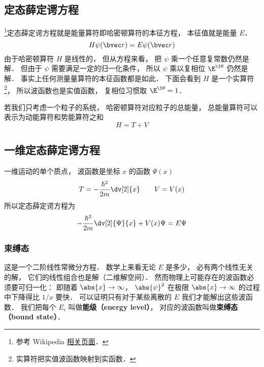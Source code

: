 
\begin{issues}
\issueTODO
\issueAbstract
\end{issues}


\subsection{定态薛定谔方程}
\footnote{参考 Wikipedia \href{https://en.wikipedia.org/wiki/Finite_potential_well}{相关页面}．}定态薛定谔方程就是能量算符即哈密顿算符的本征方程， 本征值就是能量 $E$．
\begin{equation}
H \psi(\bvec r) = E \psi(\bvec r)
\end{equation}
由于哈密顿算符 $H$ 是线性的， 但从方程来看， 把 $\psi$ 乘一个任意复常数仍然是解． 但由于 $\psi$ 需要满足一定的归一化条件， 所以 $\psi$ 乘以复相位 $\E^{\I\theta}$ 仍然是解． 事实上任何测量量算符的本征函数都是如此． 下面会看到 $H$ 是一个实算符\footnote{实算符把实值波函数映射到实函数．}， 所以波函数也是实值函数， 复相位习惯取 $\E^{\I\theta} = 1$．

若我们只考虑一个粒子的系统， 哈密顿算符对应粒子的总能量， 总能量算符可以表示为动能算符和势能算符之和
\begin{equation}
H = T + V
\end{equation}

\subsection{一维定态薛定谔方程}

一维运动的单个质点， 波函数是坐标 $x$ 的函数 $\Psi(x)$
\begin{equation}
T = -\frac{\hbar^2}{2m} \dv[2]{x} \qquad V = V(x)
\end{equation}
所以定态薛定谔方程为
\begin{equation}\label{SchEq_eq1}
-\frac{\hbar^2}{2m} \dv[2]{\Psi}{x} + V(x)\Psi = E \Psi
\end{equation}

\subsubsection{束缚态}
这是一个二阶线性常微分方程． 数学上来看无论 $E$ 是多少， 必有两个线性无关的解， 它们的线性组合也是解（二维解空间）． 然而物理上可能存在的波函数必须要可归一化： 即随着 $\abs{x} \to \infty$，  $\abs{\psi}^2$ 在极限 $\abs{x}\to\infty$ 的过程中下降得比 $1/x$ 要快． 可以证明只有对于某些离散的 $E$ 我们才能解出这些波函数． 我们把每个 $E_i$ 叫做\textbf{能级（energy level）}， 对应的波函数叫做\textbf{束缚态（bound state）}．

